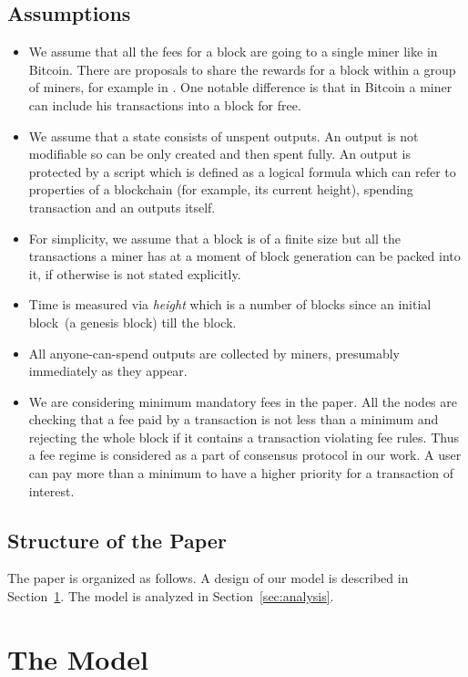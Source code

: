\documentclass[]{llncs}   %
\newcommand{\authnote}[2]{\marginpar{\parbox{\marginparwidth}{\tiny %
  \textsf{#1 {\textcolor{blue}{notes: #2}}}}}%
  \textcolor{blue}{\textbf{\dag}}}
\newcommand{\authnote}[2]{
  \textsf{#1 \textcolor{blue}{: #2}}}
\newcommand{\authnote}[2]{}
\newcommand{\knote}[1]{{\authnote{\textcolor{green}{Alex notes}}{#1}}}
\begin{document}
\subsection{Assumptions}
\begin{itemize}
  \item{} We assume that all the fees for a block are going to a single miner like in Bitcoin. There are proposals to share the rewards for a block within a group of miners, for example in \cite{eyal2016bitcoin,kogias2016enhancing}. One notable difference is that in Bitcoin a miner can include his transactions into a block for free.
  \item{} We assume that a state consists of unspent outputs. An output is not modifiable so can be only created and then spent fully. An output is protected by a script which is defined as a logical formula which can refer to properties of a blockchain (for example, its current height), spending transaction and an outputs itself. \knote{example} 
  \item{} For simplicity, we assume that a block is of a finite size but all the transactions a miner has at a moment of block generation can be packed into it, if otherwise is not stated explicitly.
  \item{} Time is measured via \textit{height} which is a number of blocks since an initial block~(a genesis block) till the block. 
  \item{} All anyone-can-spend outputs are collected by miners, presumably immediately as they appear.
  \item{} We are considering minimum mandatory fees in the paper. All the nodes are checking that a fee paid by a transaction is not less than a minimum and rejecting the whole block if it contains a transaction violating fee rules. Thus a fee regime is considered as a part of consensus protocol in our work. A user can pay more than a minimum to have a higher priority for a transaction of interest.   
\end{itemize}

\subsection{Structure of the Paper}

The paper is organized as follows. A design of our model is described in Section~\ref{sec:model}. The model is analyzed in Section~\ref{sec:analysis}.  
\knote{finish}


\section{The Model}
\label{sec:model}
\end{document}
